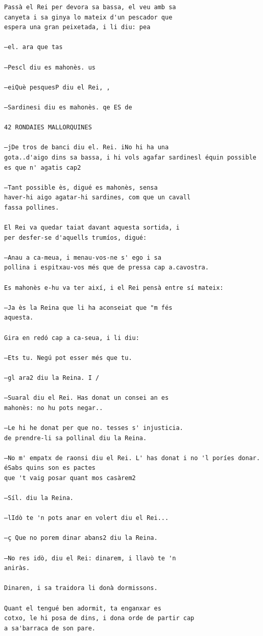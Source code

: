 \documentclass[
  letterpaper,
  DIV=11,
  numbers=noendperiod]{scrreprt}
\begin{document}
\begin{verbatim}
Passà el Rei per devora sa bassa, el veu amb sa
canyeta i sa ginya lo mateix d'un pescador que
espera una gran peixetada, i li diu: pea

—el. ara que tas

—Pescl diu es mahonès. us

—eiQuè pesquesP diu el Rei, ,

—Sardinesi diu es mahonès. qe ES de

42 RONDAIES MALLORQUINES

—jDe tros de banci diu el. Rei. iNo hi ha una
gota..d'aigo dins sa bassa, i hi vols agafar sardinesl équin possible es que n' agatis cap2

—Tant possible ès, digué es mahonès, sensa
haver-hi aigo agatar-hi sardines, com que un cavall
fassa pollines.

El Rei va quedar taiat davant aquesta sortida, i
per desfer-se d'aquells trumíos, digué:

—Anau a ca-meua, i menau-vos-ne s' ego i sa
pollina i espitxau-vos més que de pressa cap a.cavostra.

Es mahonès e-hu va ter així, i el Rei pensà entre sí mateix:

—Ja ès la Reina que li ha aconseiat que "m fés
aquesta.

Gira en redó cap a ca-seua, i li diu:

—Ets tu. Negú pot esser més que tu.

—gl ara2 diu la Reina. I /

—Suaral diu el Rei. Has donat un consei an es
mahonès: no hu pots negar..

—Le hi he donat per que no. tesses s' injusticia.
de prendre-li sa pollinal diu la Reina.

—No m' empatx de raonsi diu el Rei. L' has donat i no 'l poríes donar. éSabs quins son es pactes
que 't vaig posar quant mos casàrem2

—Síl. diu la Reina.

—lIdò te 'n pots anar en volert diu el Rei...

—ç Que no porem dinar abans2 diu la Reina.

—No res idò, diu el Rei: dinarem, i llavò te 'n
aniràs.

Dinaren, i sa traidora li donà dormissons.

Quant el tengué ben adormit, ta enganxar es
cotxo, le hi posa de dins, i dona orde de partir cap
a sa'barraca de son pare.
\end{verbatim}

\end{document}
